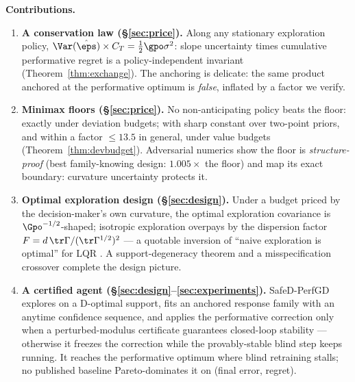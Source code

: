 \documentclass{article}
\begin{document}
\textbf{Contributions.}
\begin{enumerate}\itemsep1pt
\item \textbf{A conservation law (\S\ref{sec:price}).} Along any stationary exploration policy, $\Var(\hat\eps)\times C_T = \tfrac{1}{2}\gpo\sigma^2$: slope uncertainty times cumulative performative regret is a policy-independent invariant (Theorem~\ref{thm:exchange}). The anchoring is delicate: the same product anchored at the performative optimum is \emph{false}, inflated by a factor we verify.
\item \textbf{Minimax floors (\S\ref{sec:price}).} No non-anticipating policy beats the floor: exactly under deviation budgets; with sharp constant over two-point priors, and within a factor $\le 13.5$ in general, under value budgets (Theorem~\ref{thm:devbudget}). Adversarial numerics show the floor is \emph{structure-proof} (best family-knowing design: $1.005\times$ the floor) and map its exact boundary: curvature uncertainty protects it.
\item \textbf{Optimal exploration design (\S\ref{sec:design}).} Under a budget priced by the decision-maker's own curvature, the optimal exploration covariance is $\Gpo^{-1/2}$-shaped; isotropic exploration overpays by the dispersion factor $F = d\,\tr\Gamma/(\tr\Gamma^{1/2})^2$ --- a quotable inversion of ``naive exploration is optimal'' for LQR \citep{simchowitz2020naive}. A support-degeneracy theorem and a misspecification crossover complete the design picture.
\item \textbf{A certified agent (\S\ref{sec:design}--\ref{sec:experiments}).} SafeD-PerfGD explores on a D-optimal support, fits an anchored response family with an anytime confidence sequence, and applies the performative correction only when a perturbed-modulus certificate guarantees closed-loop stability --- otherwise it freezes the correction while the provably-stable blind step keeps running. It reaches the performative optimum where blind retraining stalls; no published baseline Pareto-dominates it on (final error, regret).
\end{enumerate}
\end{document}
